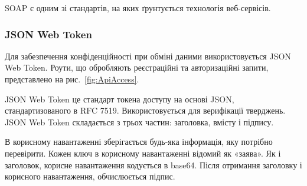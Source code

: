 SOAP є одним зі стандартів, на яких ґрунтується технологія веб-сервісів.

\subsubsection{JSON Web Token} \label{subsubsection:jwt}


Для забезпечення конфіденційності при обміні даними використовується JSON Web Token. Роути, що обробляють реєстраційні та авторизаційні запити, представлено на рис.~\ref{fig:ApiAccess}.

JSON Web Token це стандарт токена доступу на основі JSON, стандартизованого в RFC 7519. Використовується для верифікації тверджень. JSON Web Token складається з трьох частин: заголовка, вмісту і підпису.

В корисному навантаженні зберігається будь-яка інформація, яку потрібно перевірити. Кожен ключ в корисному навантаженні відомий як «заява». Як і заголовок, корисне навантаження кодується в base64. Після отримання заголовку і корисного навантаження, обчислюється підпис.
